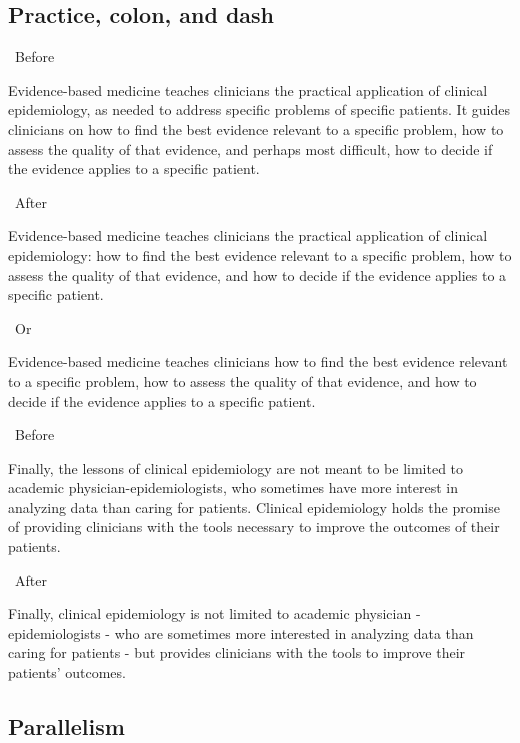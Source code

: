 \documentclass[a4paper, 12pt]{article}
\begin{document}
\subsection{Practice, colon, and dash}

\par\textbullet\ Before
\par Evidence-based medicine teaches clinicians the practical application of clinical epidemiology, as needed to address specific problems of specific patients. It guides clinicians on how to find the best evidence relevant to a specific problem, how to assess the quality of that evidence, and perhaps most difficult, how to decide if the evidence applies to a specific patient.

\par\textbullet\ After
\par Evidence-based medicine teaches clinicians the practical application of clinical epidemiology: how to find the best evidence relevant to a specific problem, how to assess the quality of that evidence, and how to decide if the evidence applies to a specific patient.

\par\textbullet\ Or
\par Evidence-based medicine teaches clinicians how to find the best evidence relevant to a specific problem, how to assess the quality of that evidence, and how to decide if the evidence applies to a specific patient.

\newpage\par\textbullet\ Before
\par Finally, the lessons of clinical epidemiology are not meant to be limited to academic physician-epidemiologists, who sometimes have more interest in analyzing data than caring for patients. Clinical epidemiology holds the promise of providing clinicians with the tools necessary to improve the outcomes of their patients.

\par\textbullet\ After
\par Finally, clinical epidemiology is not limited to academic physician - epidemiologists - who are sometimes more interested in analyzing data than caring for patients - but provides clinicians with the tools to improve their patients' outcomes.

\subsection{Parallelism}
\end{document}
